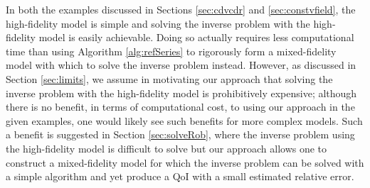 In both the examples discussed in Sections \ref{sec:cdvcdr} and \ref{sec:constvfield}, the high-fidelity model is simple and solving the inverse problem with the high-fidelity model is easily achievable. Doing so actually requires less computational time than using Algorithm \ref{alg:refSeries} to rigorously form a mixed-fidelity model with which to solve the inverse problem instead. However, as discussed in Section \ref{sec:limits}, we assume in motivating our approach that solving the inverse problem with the high-fidelity model is prohibitively expensive; although there is no benefit, in terms of computational cost, to using our approach in the given examples, one would likely see such benefits for more complex models. Such a benefit is suggested in Section \ref{sec:solveRob}, where the inverse problem using the high-fidelity model is difficult to solve but our approach allows one to construct a mixed-fidelity model for which the inverse problem can be solved with a simple algorithm and yet produce a QoI with a small estimated relative error.



